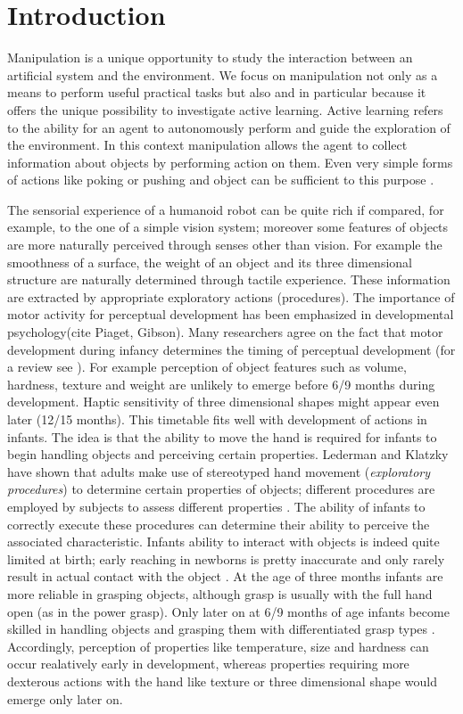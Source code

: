 \section{Introduction}
Manipulation is a unique opportunity to study the interaction between an artificial system and the environment. We focus on manipulation not only as a means to perform useful practical tasks but also and in particular because it offers the unique possibility to investigate active learning. Active learning refers to the ability for an agent to autonomously perform and guide the exploration of the environment. In this context manipulation allows the agent to collect information about objects by performing action on them. Even very simple forms of actions like poking or pushing and object can be sufficient to this purpose \cite{fitzpatrick03learning}.

The sensorial experience of a humanoid robot can be quite rich if compared, for example, to the one of a simple vision system; moreover some features of objects are more naturally perceived through senses other than vision. For example the smoothness of a surface, the weight of an object and its three dimensional structure are naturally determined through tactile experience. These information are extracted by appropriate exploratory actions (procedures).
The importance of motor activity for perceptual development has been emphasized in developmental psychology(cite Piaget, Gibson). Many researchers agree on the fact that motor development during infancy determines the timing of perceptual development (for a review see \cite{bushnell93motor}). For example perception of object features such as volume, hardness, texture and weight are unlikely to emerge before 6/9 months during development. Haptic sensitivity of three dimensional shapes might appear even later (12/15 months). This timetable fits well with development of actions in infants. The idea is that the ability to move the hand is required for infants to begin handling objects and perceiving certain properties. Lederman and Klatzky have shown that adults make use of stereotyped hand movement (\emph{exploratory procedures}) to determine certain properties of objects; different procedures are employed by subjects to assess different properties \cite{lederman87hand}. The ability of infants to correctly execute these procedures can determine their ability to perceive the associated characteristic. Infants ability to interact with objects is indeed quite limited at birth; early reaching in newborns is pretty inaccurate and only rarely result in actual contact with the object \cite{hofsten82eye-hand}. At the age of three months infants are more reliable in grasping objects, although grasp is usually with the full hand open (as in the power grasp). Only later on at 6/9 months of age infants become skilled in handling objects and grasping them with differentiated grasp types \cite{hofsten93thestructuring}. Accordingly, perception of properties like temperature, size and hardness can occur realatively early in development, whereas properties requiring more dexterous actions with the hand like texture or three dimensional shape would emerge only later on.

